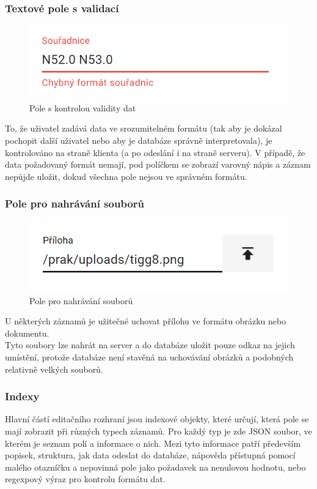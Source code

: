 \subsubsection{Textové pole s validací}
\begin{figure}
	\centering
	\includegraphics[width=\linewidth]{img/validationField.png}
	\caption{Pole s kontrolou validity dat}
\end{figure}
To, že uživatel zadává data ve srozumitelném formátu (tak aby je dokázal pochopit další
uživatel nebo aby je databáze správně interpretovala), je kontrolováno na straně klienta
(a po odeslání i na straně serveru).
V případě, že data požadovaný formát nemají, pod políčkem se zobrazí varovný nápis a
záznam nepůjde uložit, dokud všechna pole nejsou ve správném formátu.

\subsubsection{Pole pro nahrávání souborů}
\begin{figure}
	\centering
	\includegraphics[width=\linewidth]{img/uploadField.png}
	\caption{Pole pro nahrávání souborů}
\end{figure}
U některých záznamů je užitečné uchovat přílohu ve formátu obrázku nebo dokumentu.\\
Tyto soubory lze nahrát na server a do databáze uložit pouze odkaz na jejich umístění,
protože databáze není stavěná na uchovávání obrázků a podobných relativně velkých souborů.

\subsubsection{Indexy}
Hlavní částí editačního rozhraní jsou indexové objekty, které určují, která pole
se mají zobrazit při různých typech záznamů. Pro každý typ je zde JSON soubor, ve kterém
je seznam polí a informace o nich. Mezi tyto informace patří především popisek, struktura, jak
data odeslat do databáze, nápověda přístupná pomocí malého otazníčku a nepovinná pole jako
požadavek na nenulovou hodnotu, nebo regexpový výraz pro kontrolu formátu dat.

